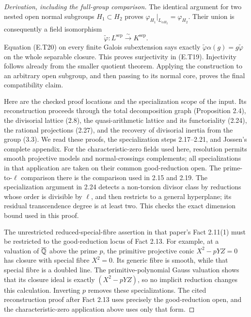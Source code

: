 \begin{proof}[Derivation, including the full-group comparison]
The identical argument for two nested open normal subgroups
$H_1\subset H_2$ proves
$\varphi_{H_1}|_{L_{\alpha H_2}}=\varphi_{H_2}$.
Their union is consequently a field isomorphism
\[
 \widetilde\varphi:L^{\mathrm{sep}}\xrightarrow{\sim}K^{\mathrm{sep}}.
\]
Equation (E.T20) on every finite Galois subextension says exactly
$\widetilde\varphi\alpha(g)=g\widetilde\varphi$ on the whole
separable closure.  This proves surjectivity in (E.T19).
Injectivity follows already from the smaller quotient theorem.
Applying the construction to an arbitrary open subgroup, and then
passing to its normal core, proves the final compatibility claim.

Here are the checked proof locations and the specialization scope
of the input.  Its reconstruction proceeds through the total
decomposition graph (Proposition 2.4), the divisorial lattice
(2.8), the quasi-arithmetic lattice and its functoriality (2.24),
the rational projections (2.27), and the recovery of divisorial
inertia from the group (3.3).  We read these proofs, the
specialization steps 2.17--2.21, and Jossen's complete appendix.
For the characteristic-zero fields used here, resolution permits
smooth projective models and normal-crossings complements; all
specializations in that application are taken on their common
good-reduction open.  The prime-to-$\ell$ comparison there is the
comparison used in 2.15 and 2.19.  The specialization argument
in 2.24 detects a non-torsion divisor class by reductions whose
order is divisible by $\ell$, and then restricts to a general
hyperplane; its residual transcendence degree is at least two.
This checks the exact dimension bound used in this proof.

The unrestricted reduced-special-fibre assertion in that paper's
Fact 2.11(1) must be restricted to the good-reduction locus of
Fact 2.13.  For example, at a valuation of $\overline{\mathbb Q}$ above
the prime $p$, the primitive projective conic
$X^2-pYZ=0$ has closure with special fibre $X^2=0$.
Its generic fibre is smooth, while that special fibre is a
doubled line.  The primitive-polynomial Gauss valuation shows
that its closure ideal is exactly $(X^2-pYZ)$, so no implicit
reduction changes this calculation.  Inverting $p$ removes
these specializations.  The cited reconstruction proof after
Fact 2.13 uses precisely the good-reduction open, and the
characteristic-zero application above uses only that form.
\end{proof}



